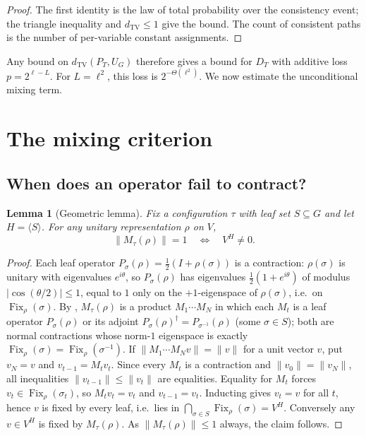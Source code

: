\documentclass[11pt]{amsart}
\newtheorem{lemma}[lemma]{Lemma}
\theoremstyle{definition}
\theoremstyle{remark}
\theoremstyle{plain}
\theoremstyle{plain}
\numberwithin{equation}{section}
\DeclareMathOperator{\Fix}{Fix}
\newcommand{\norm}[1]{\lVert #1 \rVert}
\newcommand{\abs}[1]{\lvert #1 \rvert}
\newcommand{\opn}[1]{\norm{#1}}
\newcommand{\dtv}{d_{\mathrm{TV}}}
\begin{document}
\begin{proof}
The first identity is the law of total probability over the consistency event; the
triangle inequality and $\dtv\le1$ give the bound. The count of consistent paths is the
number of per-variable constant assignments.
\end{proof}

Any bound on $\dtv(P_T,U_G)$ therefore gives a bound for $D_T$ with additive
loss $p=2^{\ell-L}$. For $L=\ell^2$, this loss is
$2^{-\Theta(\ell^2)}$. We now estimate the unconditional mixing term.

\newpage
\section{The mixing criterion}
\label{sec:criterion}

\subsection{When does an operator fail to contract?}

\begin{lemma}[Geometric lemma]
\label{lem:geom}
Fix a configuration $\tau$ with leaf set $S\subseteq G$ and let
$H=\langle S\rangle$. For any unitary representation $\rho$ on $V$,
\[
\opn{M_\tau(\rho)}=1\quad\Longleftrightarrow\quad V^H\neq0.
\]
\end{lemma}

\begin{proof}
Each leaf operator $P_\sigma(\rho)=\tfrac12(I+\rho(\sigma))$ is a contraction: $\rho(\sigma)$
is unitary with eigenvalues $e^{i\theta}$, so $P_\sigma(\rho)$ has eigenvalues
$\tfrac12(1+e^{i\theta})$ of modulus $\abs{\cos(\theta/2)}\le1$, equal to $1$ only on the
$+1$-eigenspace of $\rho(\sigma)$, i.e.\ on $\Fix_\rho(\sigma)$. By ,
$M_\tau(\rho)$ is a product $M_1\cdots M_N$ in which each $M_t$ is a leaf operator
$P_\sigma(\rho)$ or its adjoint $P_\sigma(\rho)^{\dagger}=P_{\sigma^{-1}}(\rho)$ (some
$\sigma\in S$); both are normal contractions whose norm-$1$ eigenspace is exactly
$\Fix_\rho(\sigma)=\Fix_\rho(\sigma^{-1})$. If $\norm{M_1\cdots M_N v}=\norm{v}$ for a unit
vector $v$, put $v_N=v$ and $v_{t-1}=M_t v_t$. Since every $M_t$ is a contraction and
$\norm{v_0}=\norm{v_N}$, all inequalities $\norm{v_{t-1}}\le\norm{v_t}$ are equalities.
Equality for $M_t$ forces $v_t\in\Fix_\rho(\sigma_t)$, so $M_t v_t=v_t$ and
$v_{t-1}=v_t$. Inducting gives $v_t=v$ for all $t$, hence $v$ is fixed by every leaf, i.e.\
lies in $\bigcap_{\sigma\in S}\Fix_\rho(\sigma)=V^H$. Conversely any
$v\in V^H$ is fixed by $M_\tau(\rho)$. As $\opn{M_\tau(\rho)}\le1$ always, the claim
follows.
\end{proof}
\end{document}
